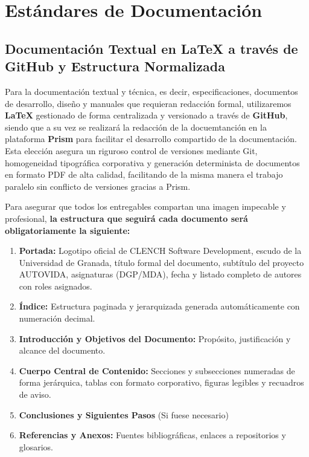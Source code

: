 \section{Estándares de Documentación}

\subsection{Documentación Textual en LaTeX a través de GitHub y Estructura Normalizada}
Para la documentación textual y técnica, es decir, especificaciones, documentos de desarrollo, diseño y manuales que requieran redacción formal, utilizaremos \textbf{\LaTeX{}} gestionado de forma centralizada y versionado a través de \textbf{GitHub}, siendo que a su vez se realizará la redacción de la docuemtanción en la plataforma \textbf{Prism} para facilitar el desarrollo compartido de la documentación. Esta elección asegura un riguroso control de versiones mediante Git, homogeneidad tipográfica corporativa y generación determinista de documentos en formato PDF de alta calidad, facilitando de la misma manera el trabajo paralelo sin conflicto de versiones gracias a Prism.

Para asegurar que todos los entregables compartan una imagen impecable y profesional, \textbf{la estructura que seguirá cada documento será obligatoriamente la siguiente:}
\begin{enumerate}[leftmargin=*]
  \item \textbf{Portada:} Logotipo oficial de CLENCH Software Development, escudo de la Universidad de Granada, título formal del documento, subtítulo del proyecto AUTOVIDA, asignaturas (DGP/MDA), fecha y listado completo de autores con roles asignados.
  \item \textbf{Índice:} Estructura paginada y jerarquizada generada automáticamente con numeración decimal.
  \item \textbf{Introducción y Objetivos del Documento:} Propósito, justificación y alcance del documento.
  \item \textbf{Cuerpo Central de Contenido:} Secciones y subsecciones numeradas de forma jerárquica, tablas con formato corporativo, figuras legibles y recuadros de aviso.
  \item \textbf{Conclusiones y Siguientes Pasos} (Si fuese necesario)
  \item \textbf{Referencias y Anexos:} Fuentes bibliográficas, enlaces a repositorios y glosarios.
\end{enumerate}

